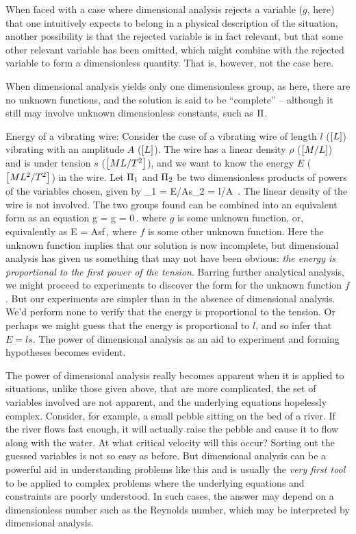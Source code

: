 When faced with a case where dimensional analysis rejects a variable ($g$, here) that one intuitively expects to belong in a physical description of the situation, another possibility is that the rejected variable is in fact relevant, but that some other relevant variable has been omitted, which might combine with the rejected variable to form a dimensionless quantity. That is, however, not the case here.

When dimensional analysis yields only one dimensionless group, as here, there are no unknown functions, and the solution is said to be ``complete'' -- although it still may involve unknown dimensionless constants, such as $\Pi$.

Energy of a vibrating wire: Consider the case of a vibrating wire of length $l$ ($\left[{L}\right]$) vibrating with an amplitude $A$ ($\left[{L}\right]$). The wire has a linear density $\rho$ ($\left[{M/L}\right]$) and is under tension $s$ ($\left[{ML/T^2}\right]$), and we want to know the energy $E$ ($\left[{ML^2/T^2}\right]$) in the wire. Let $\Pi_1$ and $\Pi_2$ be two dimensionless products of powers of the variables chosen, given by
\beq
\kdim_1 = E/As\qquad{}\qquad \kdim_2 = l/A \,.
\eeq
The linear density of the wire is not involved. The two groups found can be combined into an equivalent form as an equation
\beq
g = g = 0\,.
\eeq
where $g$ is some unknown function, or, equivalently as
\beq
E = Asf\,,
\eeq
where $f$ is some other unknown function. Here the unknown function implies that our solution is now incomplete, but dimensional analysis has given us something that may not have been obvious: \emph{the energy is proportional to the first power of the tension}. Barring further analytical analysis, we might proceed to experiments to discover the form for the unknown function $f$. But our experiments are simpler than in the absence of dimensional analysis. We'd perform none to verify that the energy is proportional to the tension. Or perhaps we might guess that the energy is proportional to $l$, and so infer that $E = ls$. The power of dimensional analysis as an aid to experiment and forming hypotheses becomes evident.

The power of dimensional analysis really becomes apparent when it is applied to situations, unlike those given above, that are more complicated, the set of variables involved are not apparent, and the underlying equations hopelessly complex. Consider, for example, a small pebble sitting on the bed of a river. If the river flows fast enough, it will actually raise the pebble and cause it to flow along with the water. At what critical velocity will this occur? Sorting out the guessed variables is not so easy as before. But dimensional analysis can be a powerful aid in understanding problems like this and is usually the \emph{very first tool} to be applied to complex problems where the underlying equations and constraints are poorly understood. In such cases, the answer may depend on a dimensionless number such as the Reynolds number, which may be interpreted by dimensional analysis.



